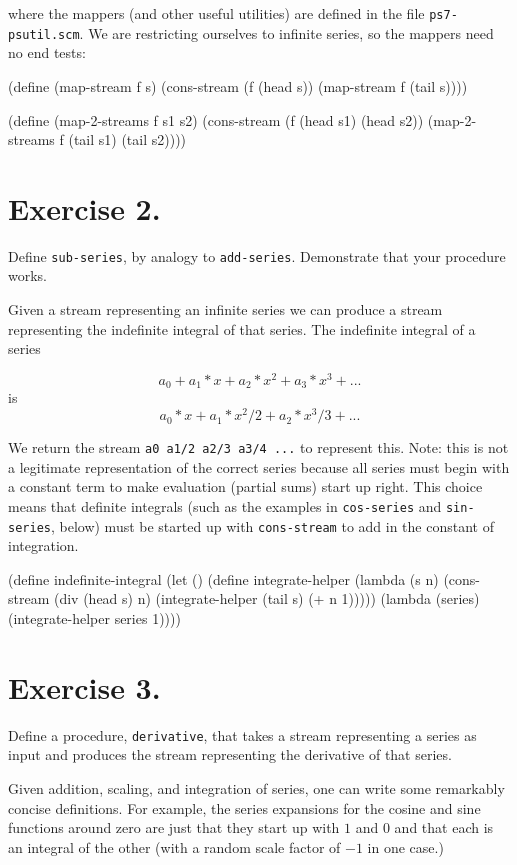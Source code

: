 \vpar
where the mappers (and other useful utilities) are defined in the file
{\tt ps7-psutil.scm}.  We are restricting ourselves to infinite series, so the
mappers need no end tests:

\beginlisp
(define (map-stream f s)
  (cons-stream (f (head s))
               (map-stream f (tail s))))

\pbrk
(define (map-2-streams f s1 s2)
  (cons-stream (f (head s1) (head s2))
               (map-2-streams f (tail s1) (tail s2))))
\endlisp

\section{Exercise 2.}
Define {\tt sub-series}, by analogy to {\tt add-series}.  Demonstrate that your
procedure works.


Given a stream representing an infinite series we can produce a stream
representing the indefinite integral of that series.  The indefinite
integral of a series

$$a_0 + a_1*x + a_2*x^2 + a_3*x^3 + ...$$
is
$$a_0*x + a_1*x^2/2 + a_2*x^3/3 + ...$$

We return the stream {\tt a0 a1/2 a2/3 a3/4 ...} to represent this.  Note:
this is not a legitimate representation of the correct series because
all series must begin with a constant term to make evaluation (partial
sums) start up right.  This choice means that definite integrals (such
as the examples in {\tt cos-series} and {\tt sin-series},
below) must be started
up with {\tt cons-stream} to add in the constant of integration.

\beginlisp
(define indefinite-integral
  (let ()
    (define integrate-helper
      (lambda (s n)
        (cons-stream (div (head s) n)
                     (integrate-helper (tail s)
                                       (+ n 1)))))
    (lambda (series)
      (integrate-helper series 1))))
\endlisp

\section{Exercise 3.}
    Define a procedure, {\tt derivative}, that takes a stream representing a
series as input and produces the stream representing the derivative of
that series.


Given addition, scaling, and integration of series, one can write some
remarkably concise definitions.  For example, the series expansions
for the cosine and sine functions around zero are just that they start
up with $1$ and $0$ and that each is an integral of the other (with a
random scale factor of $-1$ in one case.)

